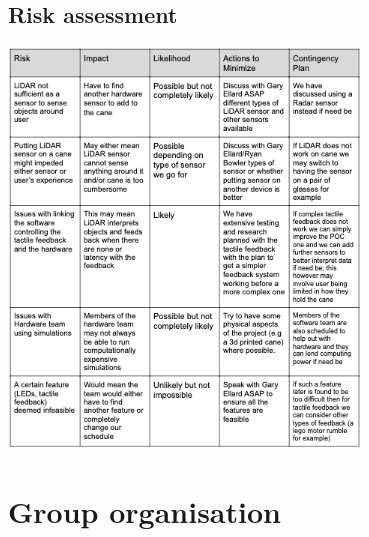 \documentclass{article}
\begin{document}
\subsection{Risk assessment}
\begin{center}
    \includegraphics [width=0.7\textwidth]{Risk Assessment.png}
\end{center}
\section{Group organisation}
\end{document}
